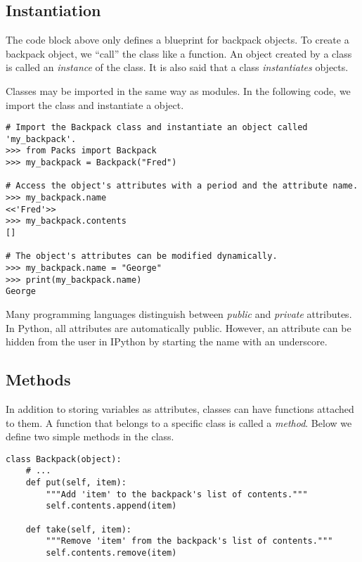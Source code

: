 \subsection*{Instantiation} %

The  code block above only defines a blueprint for backpack objects.
To create a backpack object, we ``call'' the class like a function.
An object created by a class is called an \emph{instance} of the class.
It is also said that a class \emph{instantiates} objects.

Classes may be imported in the same way as modules.
In the following code, we import the  class and instantiate a  object.

\begin{lstlisting}
# Import the Backpack class and instantiate an object called 'my_backpack'.
>>> from Packs import Backpack
>>> my_backpack = Backpack("Fred")

# Access the object's attributes with a period and the attribute name.
>>> my_backpack.name
<<'Fred'>>
>>> my_backpack.contents
[]

# The object's attributes can be modified dynamically.
>>> my_backpack.name = "George"
>>> print(my_backpack.name)
George
\end{lstlisting}

\begin{info}
Many programming languages distinguish between \emph{public} and \emph{private} attributes.
In Python, all attributes are automatically public.
However, an attribute can be hidden from the user in IPython by starting the name with an underscore. %
\end{info}

\subsection*{Methods} %

In addition to storing variables as attributes, classes can have functions attached to them.
A function that belongs to a specific class is called a \emph{method}.
Below we define two simple methods in the  class.

\begin{lstlisting}
class Backpack(object):
    # ...
    def put(self, item):
        """Add 'item' to the backpack's list of contents."""
        self.contents.append(item)

    def take(self, item):
        """Remove 'item' from the backpack's list of contents."""
        self.contents.remove(item)
\end{lstlisting}

